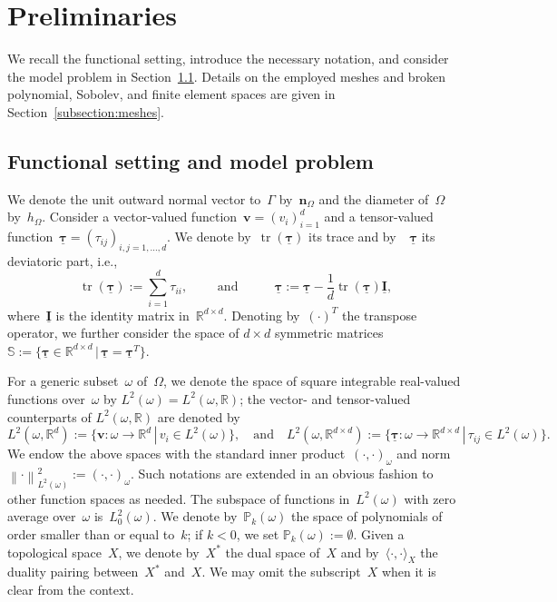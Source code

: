 \documentclass[a4paper,twoside,10pt]{article}
\theoremstyle{plain}
\theoremstyle{remark}
\theoremstyle{definition}
\numberwithin{equation}{section}
\numberwithin{figure}{section}
\newcommand{\Norm}[1]{{\left\|{#1} \right\|}}
\newcommand{\Pbbk}{\mathbb{P}_k}
\newcommand{\Rbb}{\mathbb{R}}
\newcommand{\Sbb}{\mathbb{S}}
\newcommand{\Rbbd}{\mathbb{R}^d}
\newcommand{\Rbbdd}{\mathbb{R}^{d\times d}}
\newcommand{\taubf}{\underline{\boldsymbol{\tau}}}
\newcommand{\vbf}{\mathbf{v}}
\DeclareMathOperator{\dev}{\underline{\mathbf{dev}}}
\DeclareMathOperator{\tr}{tr}
\newcommand{\nbf}{\mathbf{n}}
\newcommand{\Ltwo}{L^2}
\newcommand{\Ltwozeroomega}{\Ltwo_0(\omega)}
\newcommand{\Idbf}{\underline{\mathbf{I}}}
\begin{document}
\section{Preliminaries} \label{section:preliminaries}
We recall the functional setting, introduce the necessary notation,
and consider the model problem in Section~\ref{subsection:functional-setting}.
Details on the employed meshes and broken polynomial, Sobolev, and finite element spaces
are given in Section~\ref{subsection:meshes}.

\subsection{Functional setting and model problem} \label{subsection:functional-setting}
We denote the unit outward normal vector to~$\Gamma$
by~$\nbf_\Omega$
and the diameter of~$\Omega$ by~$h_\Omega$.
Consider a vector-valued function~$\vbf = (v_i)_{i=1}^d$
and a tensor-valued function~$\taubf = (\tau_{ij})_{i,j=1,\dots,d} $.
We denote by~$\tr(\taubf)$ its trace and by~$\dev\taubf$ its deviatoric part, i.e.,
\begin{equation*}
\tr(\taubf) := \sum_{i=1}^d \tau_{ii},
\qquad\text{ and }\qquad
\dev\taubf := \taubf - \frac1d \tr(\taubf) \Idbf,
\end{equation*}
where~$\Idbf$ is the identity matrix in~$\Rbbdd$.
Denoting by~$(\cdot)^T$ the transpose operator,
we further consider the space of $d \times d$ symmetric matrices
$\Sbb := \{\taubf \in \Rbbdd \, | \, \taubf = \taubf^T\}$.

For a generic subset~$\omega$ of~$\Omega$,
we denote the space of square integrable real-valued functions over~$\omega$ by $\Ltwo(\omega) = \Ltwo(\omega,\Rbb)$;
the vector- and tensor-valued counterparts of $\Ltwo(\omega,\Rbb)$ are denoted by
\begin{equation*}
\Ltwo(\omega,\Rbbd) := \{ \vbf : \omega \to \Rbbd \, | \, v_i \in \Ltwo(\omega) \},
\quad\text{and}\quad
\Ltwo(\omega,\Rbbdd) := \{ \taubf : \omega \to \Rbbdd \, | \, \tau_{ij} \in \Ltwo(\omega) \}.
\end{equation*}
We endow the above spaces with the standard inner product~$(\cdot,\cdot)_\omega$
and norm~$\Norm{\cdot}^2_{L^2(\omega)} := (\cdot,\cdot)_\omega$.
Such notations are extended in an obvious fashion to other function spaces as needed.
The subspace of functions in~$\Ltwo(\omega)$ with zero average over~$\omega$ is~$\Ltwozeroomega$.
We denote by~$\Pbbk(\omega)$
the space of polynomials of order smaller than or equal to~$k$;
if $k<0$,
we set
$\Pbbk(\omega):=\emptyset$.
Given a topological space~$X$,
we denote by~$X^*$ the dual space of~$X$ and by~$\langle \cdot, \cdot \rangle_{X}$
the duality pairing between~$X^*$ and~$X$.
We may omit the subscript~$X$ when it is clear from the context.
\end{document}
